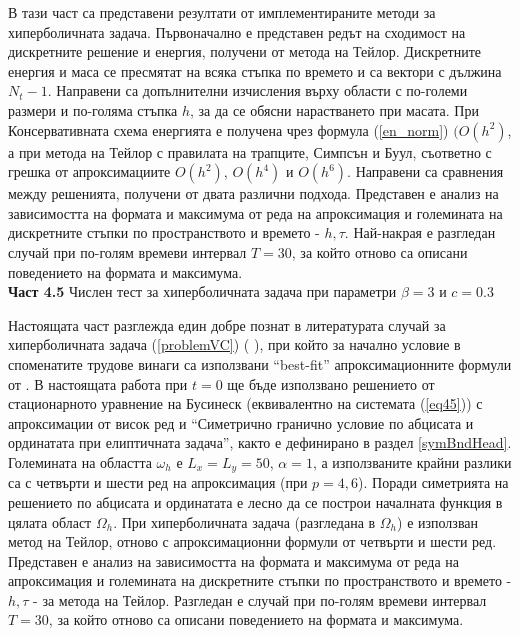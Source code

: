 \documentclass[a5paper]{article}
\newcommand{\rf}[1]{(\ref{#1})}
\theoremstyle{remark}
\begin{document}
\begin{normalsize}
В тази част са представени резултати от имплементираните методи за хиперболичната задача.
Първоначално е представен редът на сходимост на дискретните решение и енергия, получени от метода на Тейлор. Дискретните енергия и маса се пресмятат на всяка стъпка по времето и са вектори с дължина $N_t - 1$. Направени са допълнителни изчисления върху области с по-големи размери и по-голяма стъпка $h$, за да се обясни нарастването при масата. При Консервативната схема енергията е получена чрез формула \rf{en_norm} $(O(h^{2})$, а при метода на Тейлор с правилата на трапците, Симпсън и Буул, съответно с грешка от апроксимациите $O(h^{2})$, $O(h^{4})$ и $O(h^{6})$. Направени са сравнения между решенията, получени от двата различни подхода. Представен е анализ на зависимостта на формата и максимума от реда на апроксимация и големината на дискретните стъпки по пространството и времето - $h, \tau$.  Най-накрая е разгледан случай при по-голям времеви интервал $T=30$, за който отново са описани поведението на формата и максимума.\\

\textbf{Част 4.5} Числен тест за хиперболичната задача при параметри $\beta = 3$ и $c=0.3$

Настоящата част разглежда един добре познат в литературата случай за хиперболичната задача \rf{problemVC} ( \cite{ref21, ref20, ref23, ref22} ), при който за начално условие в споменатите трудове винаги са използвани ``best-fit'' апроксимационните формули от \cite{ref15}. В настоящата работа при $t=0$ ще бъде използвано решението от стационарното уравнение на Бусинеск (еквивалентно на системата \rf{eq45}) с апроксимации от висок ред и  ``Симетрично гранично условие по абцисата и ординатата при елиптичната задача'', както е дефинирано в раздел \ref{symBndHead}. Големината на областта $\omega_h$ е $L_x = L_y = 50$, $\alpha = 1$, а използваните крайни разлики са с четвърти и шести ред на апроксимация (при $p=4, 6$). Поради симетрията на решението по абцисата и ординатата е лесно да се построи началната функция в цялата област $\Omega_h$. При хиперболичната задача (разгледана в $\Omega_h$) е използван метод на Тейлор, отново с апроксимационни формули от четвърти и шести ред. Представен е анализ на зависимостта на формата и максимума от реда на апроксимация и големината на дискретните стъпки по пространството и времето - $h, \tau$ - за метода на Тейлор. Разгледан е случай при по-голям времеви интервал $T=30$, за който отново са описани поведението на формата и максимума.\\


\end{normalsize}
\end{document}
